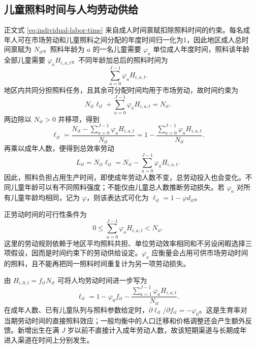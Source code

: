 \documentclass[UTF8,a4paper,zihao=-4,fontset=windows]{ctexart}
\numberwithin{equation}{section}
\begin{document}
\subsection{儿童照料时间与人均劳动供给}
\label{app:labor-time}

正文式 \eqref{eq:individual-labor-time} 来自成人时间禀赋扣除照料时间的约束。每名成年人可在市场劳动和儿童照料之间分配的年度时间归一化为1，因此地区成人总时间禀赋为 $N_{it}$。照料年龄为 $a$ 的一名儿童需要 $\varphi_a$ 单位成人年度时间，照料该年龄全部儿童需要 $\varphi_aH_{i,a,t}$。不同年龄加总后的照料时间为
\begin{equation}
  \sum_{a=0}^{J-1}\varphi_aH_{i,a,t}.
  \label{eq:app-care-time}
\end{equation}
地区内共同分担照料任务，且其余可分配时间均用于市场劳动，故时间约束为
\begin{equation}
  N_{it}\ell_{it}+\sum_{a=0}^{J-1}\varphi_aH_{i,a,t}=N_{it}.
  \label{eq:app-time-constraint}
\end{equation}
两边除以 $N_{it}>0$ 并移项，得到
\begin{equation}
  \ell_{it}
  =\frac{N_{it}-\sum_{a=0}^{J-1}\varphi_aH_{i,a,t}}{N_{it}}
  =1-\frac{\sum_{a=0}^{J-1}\varphi_aH_{i,a,t}}{N_{it}}.
  \label{eq:app-labor-time}
\end{equation}
再乘以成年人数，便得到总效率劳动
\begin{equation}
  L_{it}=N_{it}\ell_{it}
        =N_{it}-\sum_{a=0}^{J-1}\varphi_aH_{i,a,t}.
  \label{eq:app-effective-labor}
\end{equation}
因此，照料负担占用生产时间，即使成年劳动人数不变，总劳动投入也会变化。不同儿童年龄可以有不同照料强度；不能仅由儿童总人数推断劳动损失。若 $\varphi_a$ 对所有儿童年龄均相同，记为 $\varphi$，则该表达式可化为 $\ell_{it}=1-\varphi d_{it}$。

正劳动时间的可行性条件为
\begin{equation}
  0\leq\sum_{a=0}^{J-1}\varphi_aH_{i,a,t}<N_{it}.
  \label{eq:app-time-feasibility}
\end{equation}
这里的劳动规则依赖于地区平均照料共担、单位劳动效率相同和不另设闲暇选择三项假设，因而是时间约束下的劳动供给设定。$\varphi_a$ 应衡量会占用可供市场劳动时间的照料，且不能再把同一照料时间重复计为另一项劳动损失。

由 $H_{i,0,t}=f_{it}N_{it}$ 可将人均劳动时间进一步写为
\begin{equation}
  \ell_{it}=1-\varphi_0f_{it}
      -\frac{\sum_{a=1}^{J-1}\varphi_aH_{i,a,t}}{N_{it}}.
  \label{eq:app-fertility-care-channel}
\end{equation}
在成年人数、已有儿童队列与照料参数给定时，$\partial\ell_{it}/\partial f_{it}=-\varphi_0$。这是生育率对当期劳动时间的直接照料效应；一般均衡中的人口迁移和价格调整还会产生额外反馈。新增出生在满 $J$ 岁以前不直接计入成年劳动人数，故该短期渠道与长期成年进入渠道在时间上分别发生。
\end{document}
